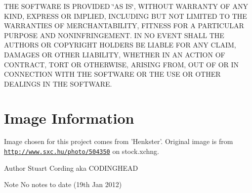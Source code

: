 T\-H\-E S\-O\-F\-T\-W\-A\-R\-E I\-S P\-R\-O\-V\-I\-D\-E\-D \char`\"{}\-A\-S I\-S\char`\"{}, W\-I\-T\-H\-O\-U\-T W\-A\-R\-R\-A\-N\-T\-Y O\-F A\-N\-Y K\-I\-N\-D, E\-X\-P\-R\-E\-S\-S O\-R I\-M\-P\-L\-I\-E\-D, I\-N\-C\-L\-U\-D\-I\-N\-G B\-U\-T N\-O\-T L\-I\-M\-I\-T\-E\-D T\-O T\-H\-E W\-A\-R\-R\-A\-N\-T\-I\-E\-S O\-F M\-E\-R\-C\-H\-A\-N\-T\-A\-B\-I\-L\-I\-T\-Y, F\-I\-T\-N\-E\-S\-S F\-O\-R A P\-A\-R\-T\-I\-C\-U\-L\-A\-R P\-U\-R\-P\-O\-S\-E A\-N\-D N\-O\-N\-I\-N\-F\-R\-I\-N\-G\-E\-M\-E\-N\-T. I\-N N\-O E\-V\-E\-N\-T S\-H\-A\-L\-L T\-H\-E A\-U\-T\-H\-O\-R\-S O\-R C\-O\-P\-Y\-R\-I\-G\-H\-T H\-O\-L\-D\-E\-R\-S B\-E L\-I\-A\-B\-L\-E F\-O\-R A\-N\-Y C\-L\-A\-I\-M, D\-A\-M\-A\-G\-E\-S O\-R O\-T\-H\-E\-R L\-I\-A\-B\-I\-L\-I\-T\-Y, W\-H\-E\-T\-H\-E\-R I\-N A\-N A\-C\-T\-I\-O\-N O\-F C\-O\-N\-T\-R\-A\-C\-T, T\-O\-R\-T O\-R O\-T\-H\-E\-R\-W\-I\-S\-E, A\-R\-I\-S\-I\-N\-G F\-R\-O\-M, O\-U\-T O\-F O\-R I\-N C\-O\-N\-N\-E\-C\-T\-I\-O\-N W\-I\-T\-H T\-H\-E S\-O\-F\-T\-W\-A\-R\-E O\-R T\-H\-E U\-S\-E O\-R O\-T\-H\-E\-R D\-E\-A\-L\-I\-N\-G\-S I\-N T\-H\-E S\-O\-F\-T\-W\-A\-R\-E.\hypertarget{index_imageInfo}{}\section{Image Information}\label{index_imageInfo}
Image chosen for this project comes from 'Henkster'. Original image is from \href{http://www.sxc.hu/photo/504350}{\tt http\-://www.\-sxc.\-hu/photo/504350} on stock.\-xchng.

\begin{DoxyAuthor}{Author}
Stuart Cording aka C\-O\-D\-I\-N\-G\-H\-E\-A\-D
\end{DoxyAuthor}
\begin{DoxyNote}{Note}
No notes to date (19th Jan 2012) 
\end{DoxyNote}
